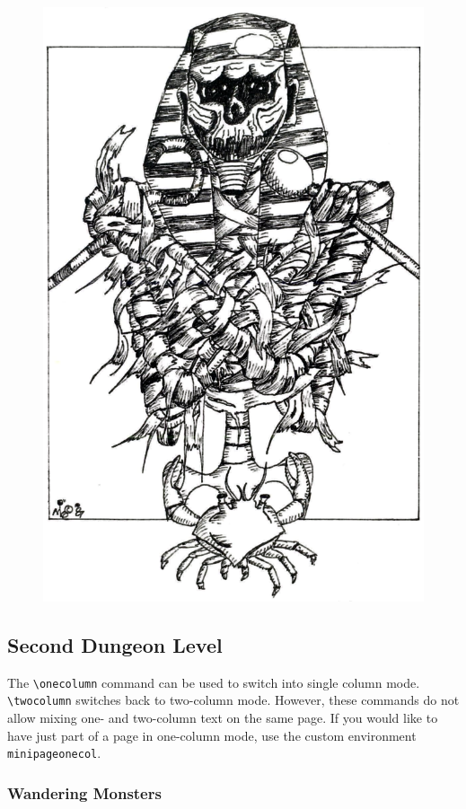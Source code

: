 \documentclass[a4paper,serif]{module}       %
\begin{document}
\begin{figure}[ht]
\includegraphics[width=\columnwidth]{module_art_interior.png}
\end{figure}


\begin{minipageonecol}[t]
\part{Second Dungeon Level}

The \texttt{\textbackslash onecolumn} command can be used to switch into single column mode. \texttt{\textbackslash twocolumn} switches back to two-column mode. However,
these commands do not allow mixing one- and two-column text on the same page. If you would like to have just part of a page in one-column mode, use the custom
environment \texttt{minipageonecol}.

\section*{Wandering Monsters}

\lipsum
\end{minipageonecol}
\end{document}
